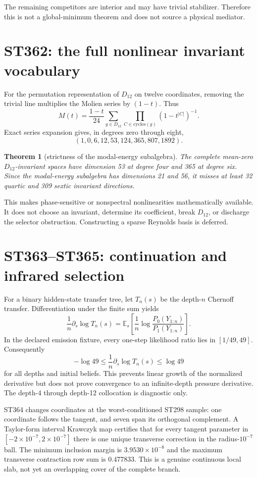 \documentclass[11pt,a4paper]{article}
\newtheorem{theorem}{Theorem}[section]
\begin{document}
The remaining competitors are interior and may have trivial stabilizer. Therefore this is
not a global-minimum theorem and does not source a physical mediator.

\section{ST362: the full nonlinear invariant vocabulary}

For the permutation representation of $D_{12}$ on twelve coordinates, removing the trivial
line multiplies the Molien series by $(1-t)$. Thus
\[
M(t)=\frac{1-t}{24}\sum_{g\in D_{12}}
\prod_{C\in\mathrm{cycles}(g)}(1-t^{|C|})^{-1}.
\]
Exact series expansion gives, in degrees zero through eight,
\[
(1,0,6,12,53,124,365,807,1892).
\]

\begin{theorem}[strictness of the modal-energy subalgebra]
The complete mean-zero $D_{12}$-invariant spaces have dimension 53 at degree four and 365
at degree six. Since the modal-energy subalgebra has dimensions 21 and 56, it misses at
least 32 quartic and 309 sextic invariant directions.
\end{theorem}

This makes phase-sensitive or nonspectral nonlinearities mathematically available. It does
not choose an invariant, determine its coefficient, break $D_{12}$, or discharge the
selector obstruction. Constructing a sparse Reynolds basis is deferred.

\section{ST363--ST365: continuation and infrared selection}

For a binary hidden-state transfer tree, let $T_n(s)$ be the depth-$n$ Chernoff transfer.
Differentiation under the finite sum yields
\[
\frac1n\partial_s\log T_n(s)
=\mathbb E_s\!\left[\frac1n\log\frac{P_0(Y_{1:n})}{P_1(Y_{1:n})}\right].
\]
In the declared emission fixture, every one-step likelihood ratio lies in $[1/49,49]$.
Consequently
\[
-\log49\leq \frac1n\partial_s\log T_n(s)\leq\log49
\]
for all depths and initial beliefs. This prevents linear growth of the normalized
derivative but does not prove convergence to an infinite-depth pressure derivative. The
depth-4 through depth-12 collocation is diagnostic only.

ST364 changes coordinates at the worst-conditioned ST298 sample: one coordinate follows
the tangent, and seven span its orthogonal complement. A Taylor-form interval Krawczyk map
certifies that for every tangent parameter in $[-2\times10^{-7},2\times10^{-7}]$ there is
one unique transverse correction in the radius-$10^{-7}$ ball. The minimum inclusion margin
is $3.9530\times10^{-8}$ and the maximum transverse contraction row sum is 0.477833. This is
a genuine continuous local slab, not yet an overlapping cover of the complete branch.
\end{document}
